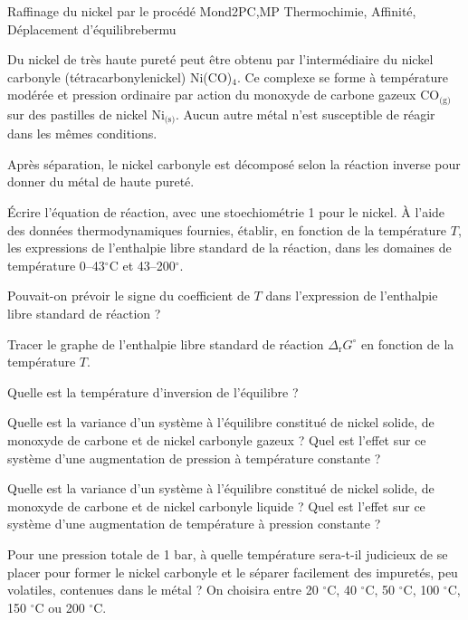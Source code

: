 
\begin{exercise}{Raffinage du nickel par le procédé Mond}{2}{PC,MP}
{Thermochimie, Affinité, Déplacement d'équilibre}{bermu}


    Du nickel de très haute pureté peut être obtenu par l’intermédiaire du nickel carbonyle (tétracarbonylenickel) Ni(CO)$_4$. Ce complexe se forme à température modérée et pression ordinaire par action du monoxyde de carbone gazeux CO$_\text{(g)}$ sur des pastilles de nickel Ni$_\text{(s)}$.
    Aucun autre métal n’est susceptible de réagir dans les mêmes conditions.
    
    Après séparation, le nickel carbonyle est décomposé selon la réaction inverse pour donner du métal de haute pureté.

\begin{questions}
    \question \'Ecrire l'équation de réaction, avec une stoechiométrie 1 pour le nickel.
    \question À l’aide des données thermodynamiques fournies, établir, en fonction de la température $T$, les expressions de l’enthalpie libre standard de la réaction, dans les domaines de température 0--43$^\circ$C et 43--200$^\circ$.
    
Pouvait-on prévoir le signe du coefficient de $T$ dans l’expression de l’enthalpie libre standard de réaction ?

    \question Tracer le graphe de l’enthalpie libre standard de réaction $\Delta_\text{r}G^\circ$ en fonction de la
température $T$.

Quelle est la température d’inversion de l’équilibre ?

    \question Quelle est la variance d’un système à l’équilibre constitué de nickel solide, de monoxyde de carbone et de nickel carbonyle gazeux ? Quel est l’effet sur ce système d’une augmentation de pression à température constante ?
    
    \question Quelle est la variance d’un système à l’équilibre constitué de nickel solide, de monoxyde de carbone et de nickel carbonyle liquide ? Quel est l’effet sur ce système d’une augmentation de température à pression constante ?
    
    \question Pour une pression totale de 1 bar, à quelle température sera-t-il judicieux de se placer pour former le nickel carbonyle et le séparer facilement des impuretés, peu volatiles, contenues dans le métal ? On choisira entre 20 $^\circ$C, 40 $^\circ$C, 50 $^\circ$C, 100 $^\circ$C, 150 $^\circ$C ou 200 $^\circ$C.
    

\end{questions}
\end{exercise}
